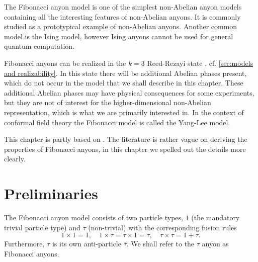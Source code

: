 \documentclass[a4paper,10pt,oneside]{book}
\theoremstyle{plain}
\theoremstyle{definition}
\theoremstyle{remark}
\begin{document}
The Fibonacci anyon model is one of the simplest non-Abelian anyon models containing all the interesting features of non-Abelian anyons. It is commonly studied as a prototypical example of non-Abelian anyons. Another common model is the Ising model, however Ising anyons cannot be used for general quantum computation.

Fibonacci anyons can be realized in the $k=3$ Reed-Rezayi state \cite{topological quantum compiling}, cf. \cref{sec:models and realizability}. In this state there will be additional Abelian phases present, which do not occur in the model that we shall describe in this chapter. These additional Abelian phases may have physical consequences for some experiments, but they are not of interest for the higher-dimensional non-Abelian representation, which is what we are primarily interested in. In the context of conformal field theory the Fibonacci model is called the Yang-Lee model.

This chapter is partly based on \cite{preskill,topological quantum compiling,short intro fib}. The literature is rather vague on deriving the properties of Fibonacci anyons, in this chapter we spelled out the details more clearly.

\section{Preliminaries}\label{sec:fibonacci preliminaries}

The Fibonacci anyon model consists of two particle types, $1$ (the mandatory trivial particle type) and $τ$ (non-trivial) with the corresponding fusion rules
\begin{equation}
  1 \times 1 = 1, \quad
  1 \times τ = τ \times 1 = τ, \quad
  τ \times τ = 1 + τ.
\end{equation}
Furthermore, $\tau$ is its own anti-particle $\overline{τ}$. We shall refer to the $τ$ anyon as Fibonacci anyons.
\end{document}
